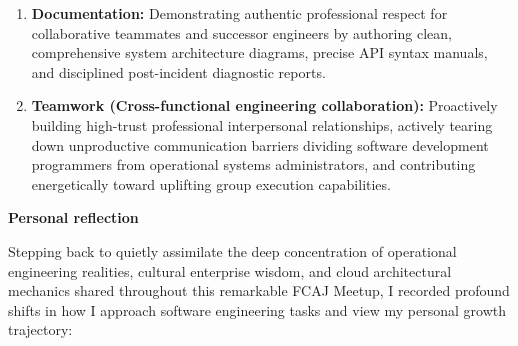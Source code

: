\begin{enumerate}
  fluency across international engineering lexicons to effortlessly
  absorb worldwide architectural documentation, engage comfortably in
  technical discussions, and deliver polished professional
  presentations.
\item
  \textbf{Documentation:} Demonstrating authentic professional respect
  for collaborative teammates and successor engineers by authoring
  clean, comprehensive system architecture diagrams, precise API syntax
  manuals, and disciplined post-incident diagnostic reports.
\item
  \textbf{Teamwork (Cross-functional engineering collaboration):}
  Proactively building high-trust professional interpersonal
  relationships, actively tearing down unproductive communication
  barriers dividing software development programmers from operational
  systems administrators, and contributing energetically toward
  uplifting group execution capabilities.
\end{enumerate}

\vspace{0.5em}\noindent\textbf{Personal reflection}\par

Stepping back to quietly assimilate the deep concentration of
operational engineering realities, cultural enterprise wisdom, and cloud
architectural mechanics shared throughout this remarkable FCAJ Meetup, I
recorded profound shifts in how I approach software engineering tasks
and view my personal growth trajectory:

